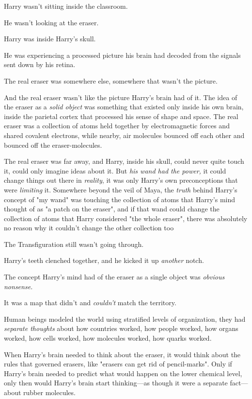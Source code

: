 Harry wasn't sitting inside the classroom.

He wasn't looking at the eraser.

Harry was inside Harry's skull.

He was experiencing a processed picture his brain had decoded from the signals
sent down by his retina.

The real eraser was somewhere else, somewhere that wasn't the picture.

And the real eraser wasn't like the picture Harry's brain had of it. The idea
of the eraser as a \emph{solid object} was something that existed only inside
his own brain, inside the parietal cortex that processed his sense of shape and
space. The real eraser was a collection of atoms held together by
electromagnetic forces and shared covalent electrons, while nearby, air
molecules bounced off each other and bounced off the eraser-molecules.

The real eraser was far away, and Harry, inside his skull, could never quite
touch it, could only imagine ideas about it. But \emph{his wand had the power,}
it could change things out there in \emph{reality}, it was only Harry's own
preconceptions that were \emph{limiting} it. Somewhere beyond the veil of Maya,
the \emph{truth} behind Harry's concept of "my wand" was touching the
collection of atoms that Harry's mind thought of as "a patch on the eraser",
and if that wand could change the collection of atoms that Harry considered
"the whole eraser", there was absolutely no reason why it couldn't change the
other collection too{\el}

The Transfiguration still wasn't going through.

Harry's teeth clenched together, and he kicked it up \emph{another} notch.

The concept Harry's mind had of the eraser as a single object was \emph{obvious
nonsense.}

It was a map that didn't and \emph{couldn't} match the territory.

Human beings modeled the world using stratified levels of organization, they
had \emph{separate thoughts} about how countries worked, how people worked, how
organs worked, how cells worked, how molecules worked, how quarks worked.

When Harry's brain needed to think about the eraser, it would think about the
rules that governed erasers, like "erasers can get rid of pencil-marks". Only
if Harry's brain needed to predict what would happen on the lower chemical
level, only then would Harry's brain start thinking---as though it were a
separate fact---about rubber molecules.

